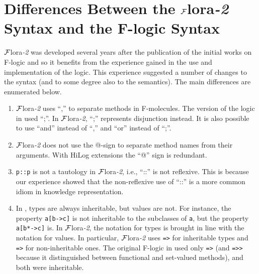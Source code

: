 \documentclass[11pt]{article}
\newcommand{\FLORA}{{\mbox{\sc ${\cal F}${lora}\rm\emph{-2}}}\xspace}
\begin{document}
\section{Differences Between the \FLORA Syntax and the F-logic Syntax}

\FLORA was developed several years after the publication of the initial
works on F-logic \cite{KLW95} and so it benefits from the experience gained
in the use and implementation of the logic. This experience suggested a
number of changes to the syntax (and to some degree also to the
semantics). The main differences are enumerated below.

\begin{enumerate}
\item \FLORA uses ``,'' to separate methods in F-molecules. The version of
  the logic in \cite{KLW95} used ``;''. In \FLORA, ``;'' represents
  disjunction instead. It is also possible to use ``and'' instead of ``,''
  and ``or'' instead of ``;''.
\item \FLORA does not use the @-sign to separate method names from their
  arguments. With HiLog extensions the ``@'' sign is redundant.
\item  {\tt p::p} is not a tautology in \FLORA, i.e., ``::'' is not
  reflexive. This is because our experience showed that the non-reflexive
  use of ``::'' is a more common idiom in knowledge representation.
\item In \cite{KLW95}, types are always inheritable, but values are not.
  For instance, the property {\tt a[b->c]} is not inheritable to the
  subclasses of {\tt a}, but the property {\tt a[b*->c]} is.  In \FLORA,
  the notation for types is brought in line with the notation for values.
  In particular, \FLORA uses {\tt *=>} for inheritable types
  and {\tt =>} for non-inheritable ones. The original F-logic in
  \cite{KLW95} used only {\tt =>} (and {\tt =>>} because it distinguished
  between functional and set-valued methods), and both were inheritable.


\end{enumerate}
\end{document}
